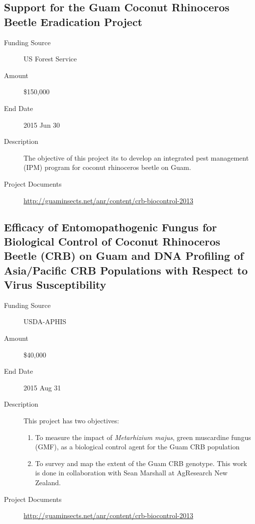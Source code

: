 \documentclass[12pt,oneside,english]{scrbook}
\begin{document}
\subsection{Support for the Guam Coconut Rhinoceros Beetle Eradication Project}

\begin{description}
	\item[Funding Source] US Forest Service
	\item[Amount] \$150,000
	\item[End Date] 2015 Jun 30
	\item[Description] The objective of this project its to develop  an integrated pest management (IPM) program for coconut rhinoceros beetle on Guam.
	\item[Project Documents] \url{http://guaminsects.net/anr/content/crb-biocontrol-2013}
\end{description}

\subsection{Efficacy of Entomopathogenic Fungus for Biological Control of Coconut Rhinoceros Beetle (CRB) on Guam and DNA Profiling of Asia/Pacific CRB Populations with Respect to Virus Susceptibility
}
\begin{description}
	\item[Funding Source] USDA-APHIS
	\item[Amount] \$40,000
	\item[End Date] 2015 Aug 31
	\item[Description] This project has two objectives:
	\begin{enumerate}
		\item To measure the impact of \textit{Metarhizium majus}, green muscardine fungus (GMF), as a biological control agent for the Guam CRB population
		\item To survey and map the extent of the Guam CRB genotype. This work is done in collaboration with Sean Marshall at AgResearch New Zealand.
	\end{enumerate} 
	\item[Project Documents] \url{http://guaminsects.net/anr/content/crb-biocontrol-2013}
\end{description}
\end{document}
